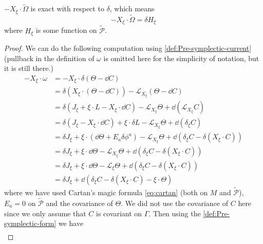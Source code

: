 \documentclass[10pt]{article}
\begin{document}
\begin{claim}
    $-X_\xi\cdot\widetilde{\Omega}$ is exact with respect to $\delta$, which means
    \begin{equation}
        -X_\xi\cdot\widetilde{\Omega}=\delta H_{\xi}
    \end{equation}
    where $H_{\xi}$ is some function on $\widetilde{\mathcal{P}}$.
\end{claim}
\begin{proof}
    We can do the following computation using \cref{def:Pre-symplectic-current} (pullback in the definition of $\omega$ is omitted here for the simplicity of notation, but it is still there.)
    \begin{equation}
        \begin{split}
            -X_\xi\cdot\omega&=-X_\xi\cdot\delta(\Theta-\dd{C})\\
                             &=\delta\left(X_{\xi}\cdot(\Theta-\dd{C})\right)-\mathcal{L}_{X_\xi}(\Theta-\dd{C})\\
                             &=\delta \left(J_{\xi}+\xi\cdot L-X_\xi \cdot\dd{C}\right)-\mathcal{L}_{X_\xi}\Theta+\dd{(\mathcal{L}_{X_\xi} C)}\\
                             &=\delta \left(J_{\xi}-X_\xi \cdot\dd{C}\right)+\xi\cdot\delta L-\mathcal{L}_{X_\xi}\Theta+\dd{(\delta_\xi C)}\\
                             &=\delta J_\xi+\xi\cdot(\dd{\Theta}+E_a\delta\phi^a)-\mathcal{L}_{X_\xi}\Theta+\dd{(\delta_\xi C-\delta(X_\xi\cdot C))}\\
                             &=\delta J_\xi+\xi\cdot\dd{\Theta}-\mathcal{L}_{X_\xi}\Theta+\dd{(\delta_\xi C-\delta(X_\xi\cdot C))}\\
                             &=\delta J_\xi+\xi\cdot\dd{\Theta}-\mathcal{L}_{\xi}\Theta+\dd{(\delta_\xi C-\delta(X_\xi\cdot C))}\\
                             &=\delta J_\xi+\dd{(\delta_\xi C-\delta(X_\xi\cdot C)-\xi\cdot\Theta)}
        \end{split}\label{eq:xomega}
    \end{equation}
    where we have used Cartan's magic formula \cref{eq:cartan} (both on $M$ and $\widetilde{\mathcal{P}}$), $E_a=0$ on $\widetilde{\mathcal{P}}$ and the covariance of $\Theta$.
    We did not use the covariance of $C$ here since we only assume that $C$ is covariant on $\Gamma$.
    Then using the \cref{def:Pre-symplectic-form} we have 
    \begin{equation}
        \begin{split}

\end{split}
\end{equation}
\end{proof}
\end{document}
